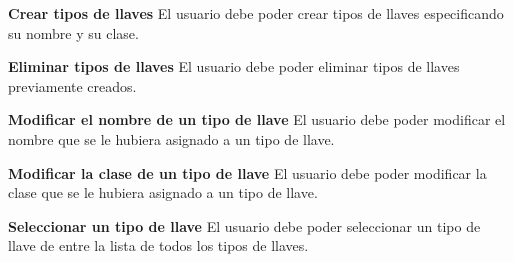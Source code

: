 \begin{functional}
	\item \textbf{Crear tipos de llaves}\newline
		El usuario debe poder crear tipos de llaves especificando su nombre y su clase.
	\item \textbf{Eliminar tipos de llaves}\newline
		El usuario debe poder eliminar tipos de llaves previamente creados.
	\item \textbf{Modificar el nombre de un tipo de llave}\newline
		El usuario debe poder modificar el nombre que se le hubiera asignado a un tipo de llave.
	\item \textbf{Modificar la clase de un tipo de llave}\newline
		El usuario debe poder modificar la clase que se le hubiera asignado a un tipo de llave.
	\item \textbf{Seleccionar un tipo de llave}\newline
		El usuario debe poder seleccionar un tipo de llave de entre la lista de todos los tipos de llaves.
\end{functional}